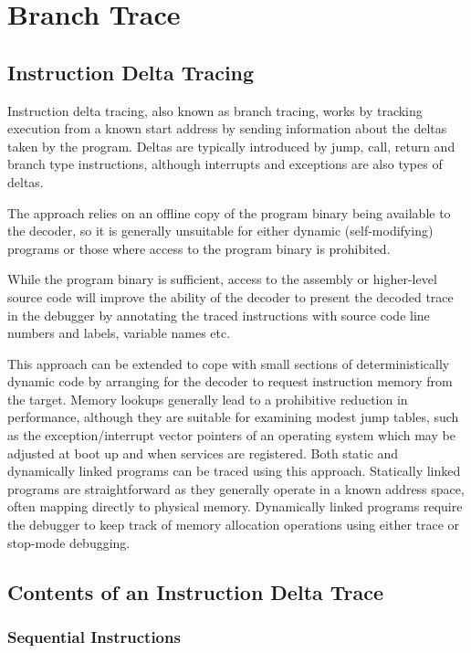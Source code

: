 \chapter{Branch Trace} \label{Branch Trace}


\section{Instruction Delta Tracing} \label{Delta Tracing}

Instruction delta tracing, also known as branch tracing, works by
tracking execution from a known start address by sending information
about the deltas taken by the program. Deltas are typically introduced
by jump, call, return and branch type instructions, although
interrupts and exceptions are also types of deltas.

The approach relies on
an offline copy of the program binary being available to the decoder, so it
is generally unsuitable for either dynamic (self-modifying) programs
or those where access to the program binary is prohibited.

While the program binary is sufficient, access to the assembly or
higher-level source code will improve the ability of the decoder to present
the decoded trace in the debugger by annotating the traced instructions with
source code line numbers and labels, variable names etc.

This approach can be extended to cope with small sections of
deterministically dynamic code by arranging for the decoder to request
instruction memory from the target. Memory lookups generally lead to a
prohibitive reduction in performance, although they are suitable for
examining modest jump tables, such as the exception/interrupt vector
pointers of an operating system which may be adjusted at boot up and
when services are registered.  Both static and dynamically linked
programs can be traced using this approach. Statically linked programs
are straightforward as they generally operate in a known address
space, often mapping directly to physical memory. Dynamically linked
programs require the debugger to keep track of memory allocation
operations using either trace or stop-mode debugging.

\section{Contents of an Instruction Delta Trace} \label{Trace Contents}

\subsection{Sequential Instructions} \label{Sequential Instructions}

